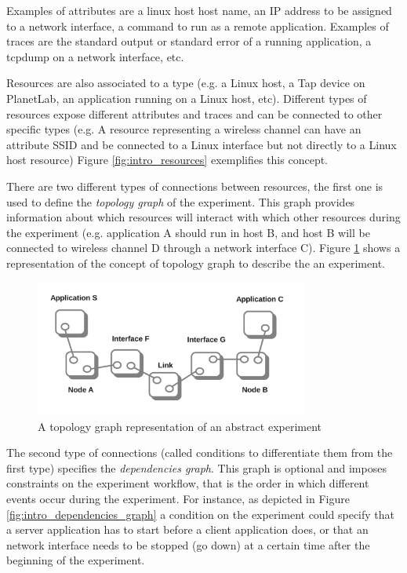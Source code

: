 Examples of attributes are a linux host host name, an IP address to be 
assigned to a network interface, a command to run as a remote application.
Examples of traces are the standard output or standard error of a
running application, a tcpdump on a network interface, etc.

Resources are also associated to a type (e.g. a Linux host, 
a Tap device on PlanetLab, an application running on a Linux host, etc).
Different types of resources expose different attributes and traces
and can be connected to other specific types (e.g. A resource representing
a wireless channel can have an attribute SSID and be connected to a 
Linux interface but not directly to a Linux host resource)
Figure \ref{fig:intro_resources} exemplifies this concept.

There are two different types of connections between resources, the 
first one is used to define the \emph{topology graph} of the experiment.
This graph provides information about which resources will interact
with which other resources during the experiment
(e.g. application A should run in host B, and host B will be connected
to wireless channel D through a network interface C).
Figure \ref{fig:intro_topo_graph} shows a representation of the concept of
topology graph to describe the an experiment.

\begin{figure}[h]
  \centering
  \includegraphics[width=0.8\textwidth]{intro_topo_graph}
  \caption{A topology graph representation of an abstract experiment}
  \label{fig:intro_topo_graph}
\end{figure}

The second type of connections (called conditions to differentiate them 
from the first type) specifies the \emph{dependencies graph}. 
This graph is optional and imposes constraints on the experiment 
workflow, that is the order in which different events occur during the 
experiment. For instance, as depicted in Figure \ref{fig:intro_dependencies_graph}
a condition on the experiment could specify that
a server application has to start before a client application does, or that
an network interface needs to be stopped (go down) at a certain time after
the beginning of the experiment. 

